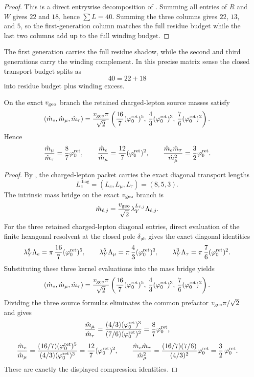 \begin{proof}
This is a direct entrywise decomposition of . Summing all entries of
$R$ and $W$ gives $22$ and $18$, hence $\sum L=40$. Summing the three columns gives
$22$, $13$, and $5$, so the first-generation column matches the full residue budget while the last
two columns add up to the full winding budget.
\end{proof}

\begin{remark}
The first generation carries the full residue shadow, while the second and third generations carry
the winding complement. In this precise matrix sense the closed transport budget splits as
\[
40=22+18
\]
into residue budget plus winding excess.
\end{remark}

\begin{theorem}
\label{thm:charged-lepton-compression}
On the exact $v_{\mathrm{geo}}$ branch the retained charged-lepton source masses satisfy
\[
(\hat m_e,\hat m_\mu,\hat m_\tau)
=
\frac{v_{\mathrm{geo}}\pi}{\sqrt2}
\left(
\frac{16}{7}(\varphi_0^{\mathrm{ret}})^5,\,
\frac{4}{3}(\varphi_0^{\mathrm{ret}})^3,\,
\frac{7}{6}(\varphi_0^{\mathrm{ret}})^2
\right).
\]
Hence
\[
\frac{\hat m_\mu}{\hat m_\tau}=\frac{8}{7}\varphi_0^{\mathrm{ret}},
\qquad
\frac{\hat m_e}{\hat m_\mu}=\frac{12}{7}(\varphi_0^{\mathrm{ret}})^2,
\qquad
\frac{\hat m_e \hat m_\tau}{\hat m_\mu^2}=\frac{3}{2}\varphi_0^{\mathrm{ret}}.
\]
\end{theorem}

\begin{proof}
By , the charged-lepton packet carries the exact diagonal
transport lengths
\[
L_e^{\mathrm{diag}}=(L_e,L_\mu,L_\tau)=(8,5,3).
\]
The intrinsic mass bridge on the exact $v_{\mathrm{geo}}$ branch is
\[
\hat m_{\ell,j}
=
\frac{v_{\mathrm{geo}}}{\sqrt2}\lambda_Y^{L_{\ell,j}}\Lambda_{\ell,j}.
\]
For the three retained charged-lepton diagonal entries, direct evaluation of the finite hexagonal
resolvent  at the closed pole $\delta_{\mathrm{ph}}$ gives the
exact diagonal identities
\[
\lambda_Y^{8}\Lambda_e
=
\pi\,\frac{16}{7}(\varphi_0^{\mathrm{ret}})^5,
\qquad
\lambda_Y^{5}\Lambda_\mu
=
\pi\,\frac{4}{3}(\varphi_0^{\mathrm{ret}})^3,
\qquad
\lambda_Y^{3}\Lambda_\tau
=
\pi\,\frac{7}{6}(\varphi_0^{\mathrm{ret}})^2.
\]
Substituting these three kernel evaluations into the mass bridge yields
\[
(\hat m_e,\hat m_\mu,\hat m_\tau)
=
\frac{v_{\mathrm{geo}}\pi}{\sqrt2}
\left(
\frac{16}{7}(\varphi_0^{\mathrm{ret}})^5,\,
\frac{4}{3}(\varphi_0^{\mathrm{ret}})^3,\,
\frac{7}{6}(\varphi_0^{\mathrm{ret}})^2
\right).
\]
Dividing the three source formulas eliminates the common prefactor $v_{\mathrm{geo}}\pi/\sqrt2$ and gives
\[
\frac{\hat m_\mu}{\hat m_\tau}
=
\frac{(4/3)(\varphi_0^{\mathrm{ret}})^3}{(7/6)(\varphi_0^{\mathrm{ret}})^2}
=
\frac{8}{7}\varphi_0^{\mathrm{ret}},
\]
\[
\frac{\hat m_e}{\hat m_\mu}
=
\frac{(16/7)(\varphi_0^{\mathrm{ret}})^5}{(4/3)(\varphi_0^{\mathrm{ret}})^3}
=
\frac{12}{7}(\varphi_0^{\mathrm{ret}})^2,
\qquad
\frac{\hat m_e \hat m_\tau}{\hat m_\mu^2}
=
\frac{(16/7)(7/6)}{(4/3)^2}\varphi_0^{\mathrm{ret}}
=
\frac32\,\varphi_0^{\mathrm{ret}}.
\]
These are exactly the displayed compression identities.
\end{proof}

